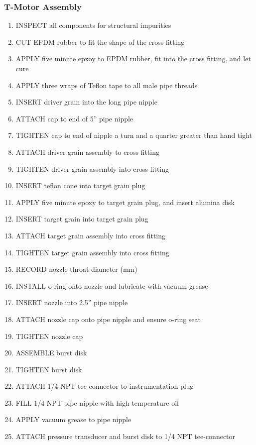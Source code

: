 \subsubsection*{T-Motor Assembly}
\begin{enumerate}
    \item INSPECT all components for structural impurities
    \item CUT EPDM rubber to fit the shape of the cross fitting
    \item APPLY five minute epxoy to EPDM rubber, fit into the cross fitting, and let cure
    \item APPLY three wraps of Teflon tape to all male pipe threads
    \item INSERT driver grain into the long pipe nipple
    \item ATTACH cap to end of 5'' pipe nipple
    \item TIGHTEN cap to end of nipple a turn and a quarter greater than hand tight
    \item ATTACH driver grain assembly to cross fitting
    \item TIGHTEN driver grain assembly into cross fitting
    \item INSERT teflon cone into target grain plug
    \item APPLY five minute epoxy to target grain plug, and insert alumina disk
    \item INSERT target grain into target grain plug
    \item ATTACH target grain assembly into cross fitting
    \item TIGHTEN target grain assembly into cross fitting
    \item RECORD nozzle throat diameter (mm)
    \item INSTALL o-ring onto nozzle and lubricate with vacuum grease
    \item INSERT nozzle into 2.5'' pipe nipple
    \item ATTACH nozzle cap onto pipe nipple and ensure o-ring seat
    \item TIGHTEN nozzle cap
    \item ASSEMBLE burst disk
    \item TIGHTEN burst disk
    \item ATTACH 1/4 NPT tee-connector to instrumentation plug
    \item FILL 1/4 NPT pipe nipple with high temperature oil
    \item APPLY vacuum grease to pipe nipple
    \item ATTACH pressure transducer and burst disk to 1/4 NPT tee-connector

\end{enumerate}
